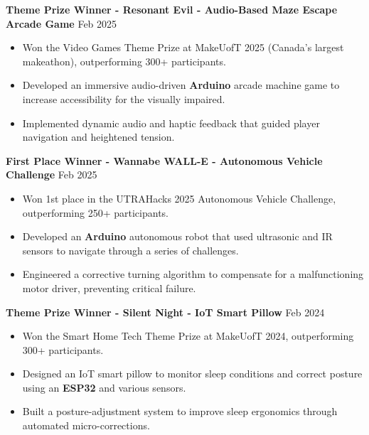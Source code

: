 \documentclass[10pt,letterpaper]{article}
\begin{document}
\vspace*{0.5em}
\textbf{Theme Prize Winner - Resonant Evil - Audio-Based Maze Escape Arcade Game} \hfill Feb 2025 \\
\begin{itemize}
    \item Won the Video Games Theme Prize at MakeUofT 2025 (Canada's largest makeathon), outperforming 300+ participants. 
    \item Developed an immersive audio-driven \textbf{Arduino} arcade machine game to increase accessibility for the visually impaired.
    \item Implemented dynamic audio and haptic feedback that guided player navigation and heightened tension. 
\end{itemize}



\vspace*{0.5em}
\textbf{First Place Winner - Wannabe WALL-E - Autonomous Vehicle Challenge} \hfill Feb 2025 \\
\begin{itemize}
    \item Won 1st place in the UTRAHacks 2025 Autonomous Vehicle Challenge, outperforming 250+ participants. 
    \item Developed an \textbf{Arduino} autonomous robot that used ultrasonic and IR sensors to navigate through a series of challenges.
    \item Engineered a corrective turning algorithm to compensate for a malfunctioning motor driver, preventing critical failure. 
\end{itemize}




\vspace*{0.5em}
\textbf{Theme Prize Winner - Silent Night - IoT Smart Pillow} \hfill Feb 2024 \\
\begin{itemize}
    \item Won the Smart Home Tech Theme Prize at MakeUofT 2024, outperforming 300+ participants.  
    \item Designed an IoT smart pillow to monitor sleep conditions and correct posture using an \textbf{ESP32} and various sensors.
    \item Built a posture-adjustment system to improve sleep ergonomics through automated micro-corrections. 
\end{itemize}
\end{document}

